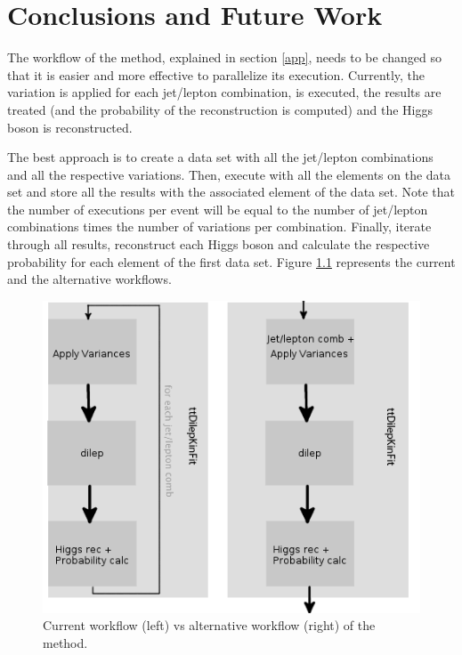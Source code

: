
\chapter{Conclusions and Future Work}

The workflow of the \ttDilepKinFit method, explained in section \ref{app}, needs to be changed so that it is easier and more effective to parallelize its execution. Currently, the variation is applied for each jet/lepton combination, \dilep is executed, the results are treated (and the probability of the reconstruction is computed) and the Higgs boson is reconstructed.

The best approach is to create a data set with all the jet/lepton combinations and all the respective variations. Then, execute \dilep with all the elements on the data set and store all the results with the associated element of the data set. Note that the number of \dilep executions per event will be equal to the number of jet/lepton combinations times the number of variations per combination. Finally, iterate through all results, reconstruct each Higgs boson and calculate the respective probability for each element of the first data set. Figure \ref{fig:pipeline} represents the current and the alternative workflows.

\begin{figure}[!htp]
	\begin{center}
		\includegraphics[scale=0.5]{../../common/img/pipeline.png}
		\caption{Current workflow (left) vs alternative workflow (right) of the \ttDilepKinFit method.}
		\label{fig:pipeline}
	\end{center}
\end{figure}

